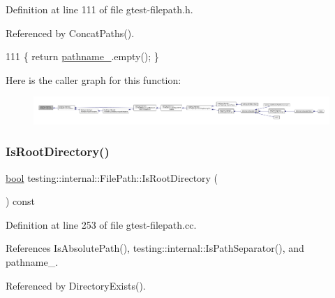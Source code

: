 Definition at line 111 of file gtest-\/filepath.\+h.



Referenced by Concat\+Paths().


\begin{DoxyCode}
111 \{ \textcolor{keywordflow}{return} \hyperlink{classtesting_1_1internal_1_1FilePath_a12ce28a0015f85604e0372230fa18d6e}{pathname\_}.empty(); \}
\end{DoxyCode}
Here is the caller graph for this function\+:
\nopagebreak
\begin{figure}[H]
\begin{center}
\leavevmode
\includegraphics[width=350pt]{classtesting_1_1internal_1_1FilePath_a2c165c5510e8705ade547849a9234a6e_icgraph}
\end{center}
\end{figure}
\mbox{\label{classtesting_1_1internal_1_1FilePath_a0661adf59aec40c40c8e39b888d68142}} 
\subsubsection{\texorpdfstring{Is\+Root\+Directory()}{IsRootDirectory()}}
{\footnotesize\ttfamily \hyperlink{classbool}{bool} testing\+::internal\+::\+File\+Path\+::\+Is\+Root\+Directory (\begin{DoxyParamCaption}{ }\end{DoxyParamCaption}) const}



Definition at line 253 of file gtest-\/filepath.\+cc.



References Is\+Absolute\+Path(), testing\+::internal\+::\+Is\+Path\+Separator(), and pathname\+\_\+.



Referenced by Directory\+Exists().


